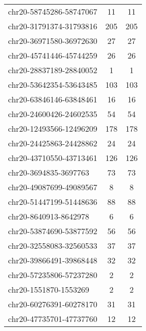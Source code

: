 \begin{longtable}{lSS}
	chr20-58745286-58747067 & 11     & 11                                        \\
	chr20-31791374-31793816 & 205    & 205                                       \\
	chr20-36971580-36972630 & 27     & 27                                        \\
	chr20-45741446-45744259 & 26     & 26                                        \\
	chr20-28837189-28840052 & 1      & 1                                         \\
	chr20-53642354-53643485 & 103    & 103                                       \\
	chr20-63846146-63848461 & 16     & 16                                        \\
	chr20-24600426-24602535 & 54     & 54                                        \\
	chr20-12493566-12496209 & 178    & 178                                       \\
	chr20-24425863-24428862 & 24     & 24                                        \\
	chr20-43710550-43713461 & 126    & 126                                       \\
	chr20-3694835-3697763   & 73     & 73                                        \\
	chr20-49087699-49089567 & 8      & 8                                         \\
	chr20-51447199-51448636 & 88     & 88                                        \\
	chr20-8640913-8642978   & 6      & 6                                         \\
	chr20-53874690-53877592 & 56     & 56                                        \\
	chr20-32558083-32560533 & 37     & 37                                        \\
	chr20-39866491-39868448 & 32     & 32                                        \\
	chr20-57235806-57237280 & 2      & 2                                         \\
	chr20-1551870-1553269   & 2      & 2                                         \\
	chr20-60276391-60278170 & 31     & 31                                        \\
	chr20-47735701-47737760 & 12     & 12                                        \\

\end{longtable}
